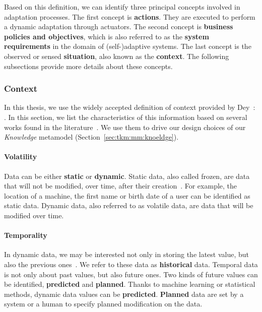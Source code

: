 Based on this definition, we can identify three principal concepts involved in adaptation processes.
The first concept is \textbf{actions}. 
They are executed to perform a dynamic adaptation through actuators.
The second concept is \textbf{business policies and objectives}, which is also referred to as the \textbf{system requirements} in the domain of (self-)adaptive systems.
The last concept is the observed or sensed \textbf{situation}, also known as the \textbf{context}.
The following subsections provide more details about these concepts.

\subsubsection{Context}

In this thesis, we use the widely accepted definition of context provided by \linebreak Dey~\cite{DBLP:journals/puc/Dey01}: .
In this section, we list the characteristics of this information based on several works found in the literature~\cite{DBLP:conf/pervasive/HenricksenIR02, DBLP:conf/seke/0001FNMKT14, DBLP:journals/percom/BettiniBHINRR10, DBLP:journals/comsur/PereraZCG14}.
We use them to drive our design choices of our \textit{Knowledge} \gls{metamodel} (\cf Section~\ref{sec:tkm:mm:knoeldge}).

\paragraph{Volatility}
Data can be either \textbf{static} or \textbf{dynamic}.
Static data, also called frozen, are data that will not be modified, over time, after their creation~\cite{DBLP:conf/pervasive/HenricksenIR02, DBLP:journals/comsur/MakrisSS13, DBLP:journals/percom/BettiniBHINRR10}.
For example, the location of a machine, the first name or birth date of a user can be identified as static data. 
Dynamic data, also referred to as volatile data, are data that will be modified over time.

\paragraph{Temporality}
In dynamic data, we may be interested not only in storing the latest value, but also the previous ones~\cite{DBLP:conf/seke/0001FNMKT14, DBLP:conf/pervasive/HenricksenIR02}. 
We refer to these data as \textbf{historical} data.
Temporal data is not only about past values, but also future ones. 
Two kinds of future values can be identified, \textbf{predicted} and \textbf{planned}.  
Thanks to machine learning or statistical methods, dynamic data values can be \textbf{predicted}. 
\textbf{Planned} data are set by a system or a human to specify planned modification on the data.

